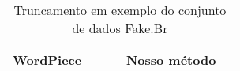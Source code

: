 \documentclass[cic,tc]{iiufrgs}
\begin{document}
\begin{table}[h]
\caption{Truncamento em exemplo do conjunto de dados Fake.Br}
\begin{tabular}{p{0.45\linewidth} | p{0.45\linewidth}}
\hline
WordPiece                                                                                                                                                                                                                                                                                                                                                                                                                                                                                                                                                                                                                                                                                                                                                                                                                                                                                                                                              & Nosso método                                                                                                                                                                                                                                                                                                                                                                                                                                                                                                                                                                                                                                                                                                                                                                                                                                                                                                 \\ \hline

\end{tabular}
\end{table}
\end{document}
